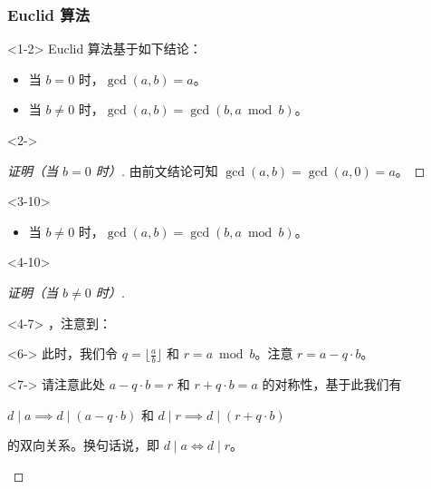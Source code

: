 \documentclass{../pkslide}
\begin{document}
\begin{frame}
  \frametitle{Euclid 算法}
  \begin{onlyenv}<1-2>
    Euclid 算法基于如下结论：
    
    \begin{itemize}
      \item 当 $b = 0$ 时，$\gcd(a, b) = a$。
      \item 当 $b \ne 0$ 时，$\gcd(a, b) = \gcd(b, a \bmod b)$。
    \end{itemize}
    
    \begin{uncoverenv}<2->
      \begin{proof}[证明（当 $b = 0$ 时）]
        \renewcommand{\qedsymbol}{（续……）}
        由前文结论可知 $\gcd(a, b) = \gcd(a, 0) = a$。
      \end{proof}
    \end{uncoverenv}
  \end{onlyenv}
  
  \begin{onlyenv}<3-10>
    \begin{itemize}
      \item 当 $b \ne 0$ 时，$\gcd(a, b) = \gcd(b, a \bmod b)$。
    \end{itemize}
    
    \begin{uncoverenv}<4-10>
      \begin{proof}[证明（当 $b \ne 0$ 时）]
        \begin{onlyenv}<4-7>
          ，注意到：\\
          
          \begin{uncoverenv}<6->
            \emptyline
            此时，我们令 $q = \big\lfloor \frac{a}{b} \big\rfloor$ 和 $r = a \bmod b$。注意 $r = a - q \cdot b$。
          \end{uncoverenv}
          
          \begin{uncoverenv}<7->
            请注意此处 $a - q \cdot b = r$ 和 $r + q \cdot b = a$ 的对称性，基于此我们有
            \begin{center}
              $d \mid a \implies d \mid (a - q \cdot b)$ 和 $d \mid r \implies d \mid (r + q \cdot b)$
            \end{center}
            的双向关系。换句话说，即 $d \mid a \iff d \mid r$。
          \end{uncoverenv}
        \end{onlyenv}
        

\end{proof}
\end{uncoverenv}
\end{onlyenv}
\end{frame}
\end{document}
